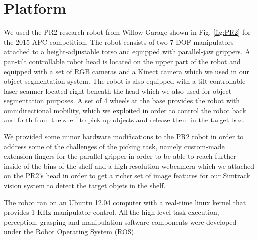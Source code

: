 \section{Platform}
\label{sec:platform}

We used the PR2 research robot from Willow Garage shown in Fig.
\ref{fig:PR2} for the 2015 APC competition. The robot consists of two
7-DOF manipulators attached to a height-adjustable torso and equipped with parallel-jaw
grippers. A pan-tilt controllable robot head is located on the upper part of the robot
and equipped with a set of RGB cameras and a Kinect camera which we used in
our object segmentation system. The robot is also
equipped with a tilt-controllable laser scanner located right beneath the head which we
also used for object segmentation purposes.
A set of 4 wheels at the base provides the robot with omnidirectional mobility, which we
exploited in order to control the robot back and forth from the shelf to pick up objects
and release them in the target box.

We provided some minor hardware modifications to the PR2 robot in order to
address some of the challenges  of the picking task,
namely custom-made extension fingers for the parallel gripper in order
to be able to reach further inside of the bins of the shelf and a high resolution
webcamera which we attached on the PR2's head in order to get
a richer set of image features for our Simtrack vision system to detect the target 
objets in the shelf.

The robot ran on an Ubuntu 12.04 computer with a real-time linux kernel that provides
1 KHz manipulator control. All the high level task execution, perception, grasping and manipulation software components were developed under the Robot Operating System (ROS).
